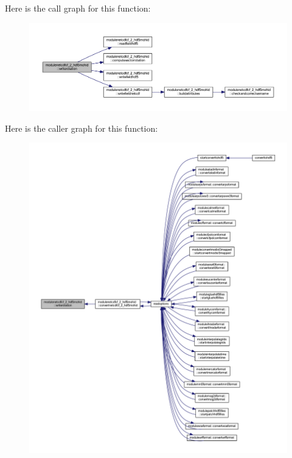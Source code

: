 Here is the call graph for this function\+:\nopagebreak
\begin{figure}[H]
\begin{center}
\leavevmode
\includegraphics[width=350pt]{namespacemodulenetcdfcf__2__hdf5mohid_a92d3ed75b91b1a0e6d04680c3dfdbad0_cgraph}
\end{center}
\end{figure}
Here is the caller graph for this function\+:\nopagebreak
\begin{figure}[H]
\begin{center}
\leavevmode
\includegraphics[width=350pt]{namespacemodulenetcdfcf__2__hdf5mohid_a92d3ed75b91b1a0e6d04680c3dfdbad0_icgraph}
\end{center}
\end{figure}
\mbox{\label{namespacemodulenetcdfcf__2__hdf5mohid_ac7924022182350a5df92f593c9dd7c76}} 
